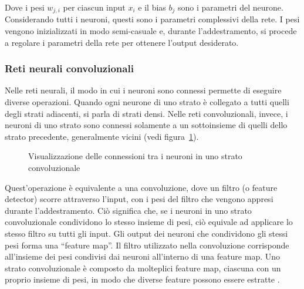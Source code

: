 Dove i pesi $w_{j,i}$ per ciascun input $x_i$ e il bias $b_j$ sono i parametri
del neurone. Considerando tutti i neuroni, questi sono i parametri complessivi
della rete. I pesi vengono inizializzati in modo semi-casuale e, durante
l'addestramento, si procede a regolare i parametri della rete per ottenere
l'output desiderato.

\subsubsection{Reti neurali convoluzionali}

Nelle reti neurali, il modo in cui i neuroni sono connessi permette di
eseguire diverse operazioni. Quando ogni neurone di uno strato è collegato a
tutti quelli degli strati adiacenti, si parla di strati densi. Nelle reti
convoluzionali, invece, i neuroni di uno strato sono connessi solamente a un
sottoinsieme di quelli dello strato precedente, generalmente vicini (vedi
figura~\ref{fig:convnet}).

\begin{figure}[!ht]
    \centering
    \begin{neuralnetwork}[height=4]
        \newcommand{\nodetextclear}[2]{}
        \hiddenlayer[count=4, bias=false,  text=\nodetextclear]        
        \hiddenlayer[count=4, bias=false,  text=\nodetextclear] 
        \link[from layer=0, to layer=1, from node=1, to node=1]
        \link[from layer=0, to layer=1, from node=2, to node=2]
        \link[from layer=0, to layer=1, from node=3, to node=3]
        \link[from layer=0, to layer=1, from node=4, to node=4]

        \link[from layer=0, to layer=1, from node=1, to node=2]
        \link[from layer=0, to layer=1, from node=2, to node=3]
        \link[from layer=0, to layer=1, from node=3, to node=4]

        \link[from layer=0, to layer=1, from node=4, to node=3]
        \link[from layer=0, to layer=1, from node=3, to node=2]
        \link[from layer=0, to layer=1, from node=2, to node=1]
    \end{neuralnetwork}
    \caption{Visualizzazione delle connessioni tra i neuroni in uno strato
    convoluzionale} 
    \label{fig:convnet}
\end{figure}

Quest'operazione è equivalente a una convoluzione, dove un filtro (o feature
detector) scorre attraverso l'input, con i pesi del filtro che vengono appresi
durante l'addestramento. Ciò significa che, se i neuroni in uno strato
convoluzionale condividono lo stesso insieme di pesi, ciò equivale ad
applicare lo stesso filtro su tutti gli input. Gli output dei neuroni che
condividono gli stessi pesi forma una ``feature map''. Il filtro utilizzato
nella convoluzione corrisponde all'insieme dei pesi condivisi dai neuroni
all'interno di una feature map. Uno strato convoluzionale è composto da
molteplici feature map, ciascuna con un proprio insieme di pesi, in modo che
diverse feature possono essere estratte \cite{lecun1998}.

